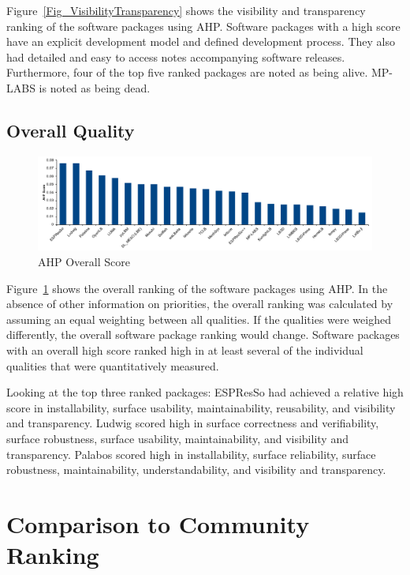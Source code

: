 \documentclass[final, 3p, times, authoryear]{elsarticle}
\begin{document}
Figure~\ref{Fig_VisibilityTransparency} shows the visibility and transparency
ranking of the software packages using AHP. Software packages with a high score
have an explicit development model and defined development process. They also
had detailed and easy to access notes accompanying software releases.
Furthermore, four of the top five ranked packages are noted as being alive.
MP-LABS is noted as being dead.

\subsection{Overall Quality}

\begin{figure}[h!]
	\centering
		\includegraphics[width=1.0\textwidth]{./figures/finalscore_chart.pdf}
		\caption{AHP Overall Score}
		\label{Fig_OverallScore}
\end{figure}

Figure~\ref{Fig_OverallScore} shows the overall ranking of the software packages
using AHP. In the absence of other information on priorities, the overall
ranking was calculated by assuming an equal weighting between all qualities. If the
qualities were weighed differently, the overall software package ranking would
change. Software packages with an overall high score ranked high in at least
several of the individual qualities that were quantitatively measured. 

Looking at the top three ranked packages: ESPResSo had achieved a
relative high score in installability, surface usability, maintainability, reusability, and visibility and transparency. Ludwig scored high in surface correctness and verifiability, surface robustness, surface usability, maintainability, and visibility and transparency. Palabos scored high in installability, surface reliability, surface robustness, maintainability, understandability, and visibility and transparency. 

\section{Comparison to Community Ranking} \label{repmetrics}
\end{document}
